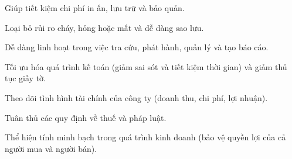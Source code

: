 Giúp tiết kiệm chi phí in ấn, lưu trữ và bảo quản.

Loại bỏ rủi ro cháy, hỏng hoặc mất và dễ dàng sao lưu.

Dễ dàng linh hoạt trong việc tra cứu, phát hành, quản lý và tạo báo cáo.

Tối ưu hóa quá trình kế toán (giảm sai sót và tiết kiệm thời gian) và giảm thủ tục giấy tờ.

Theo dõi tình hình tài chính của công ty (doanh thu, chi phí, lợi nhuận).

Tuân thủ các quy định về thuế và pháp luật.

Thể hiện tính minh bạch trong quá trình kinh doanh (bảo vệ quyền lợi của cả người mua và người bán).